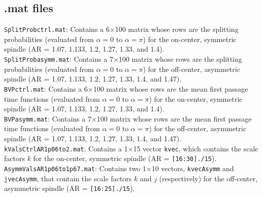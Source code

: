 \documentclass{article}
\begin{document}
\subsection{.mat files}
\noindent\texttt{SplitProbctrl.mat}: Contains a 6$\times$100 matrix whose rows are the splitting probabilities (evaluated from $\alpha = 0$ to $\alpha = \pi$) for the on-center, symmetric spindle (AR = 1.07, 1.133, 1.2, 1.27, 1.33, and 1.4). \\[3pt]

\noindent\texttt{SplitProbasymm.mat}: Contains a 7$\times$100 matrix whose rows are the splitting probabilities (evaluated from $\alpha = 0$ to $\alpha = \pi$) for the off-center, asymmetric spindle (AR = 1.07, 1.133, 1.2, 1.27, 1.33, 1.4, and 1.47).
\\[3pt]

\noindent\texttt{BVPctrl.mat}: Contains a 6$\times$100 matrix whose rows are the mean first passage time functions (evaluated from $\alpha = 0$ to $\alpha = \pi$) for the on-center, symmetric spindle (AR = 1.07, 1.133, 1.2, 1.27, 1.33, and 1.4). \\[3pt]

\noindent\texttt{BVPasymm.mat}: Contains a 7$\times$100 matrix whose rows are the mean first passage time functions (evaluated from $\alpha = 0$ to $\alpha = \pi$) for the off-center, asymmetric spindle (AR = 1.07, 1.133, 1.2, 1.27, 1.33, 1.4, and 1.47).
\\[3pt]

\noindent\texttt{kValsCtrlAR1p06to2.mat}: Contains a 1$\times$15 vector \texttt{kvec}, which contains the scale factors $k$ for the on-center, symmetric spindle (AR = \texttt{[16:30]./15}).
\\[3pt]

\noindent\texttt{AsymmValsAR1p06to1p67.mat}: Contains two 1$\times$10 vectors, \texttt{kvecAsymm} and \texttt{jvecAsymm}, that contain the scale factors $k$ and $j$ (respectively) for the off-center, asymmetric spindle (AR = \texttt{[16:25]./15}).
\end{document}
